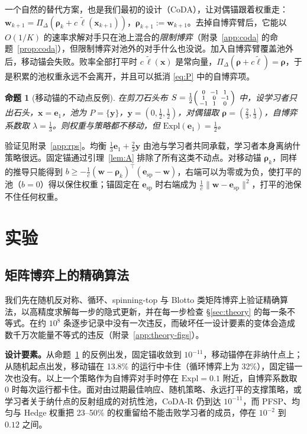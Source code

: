 \documentclass{article}
\theoremstyle{plain}
\newtheorem{proposition}[theorem]{命题}
\theoremstyle{remark}
\newcommand{\Expl}{\mathrm{Expl}}
\newcommand{\Proj}{\Pi}
\newcommand{\simplex}{\Delta}
\newcommand{\bx}{{\bm{x}}}
\newcommand{\by}{{\bm{y}}}
\newcommand{\bw}{{\bm{w}}}
\newcommand{\be}{{\bm{e}}}
\newcommand{\brho}{{\bm{\rho}}}
\newcommand{\bell}{{\bm{\ell}}}
\newcommand{\aug}{\tilde{\bell}}
\newcommand{\esp}{\be_{\mathrm{sp}}}
\newcommand{\coda}{CoDA}
\newcommand{\codar}{CoDA-R}
\begin{document}
一个自然的替代方案，也是我们最初的设计（\coda{}），让对偶锚跟着权重走：$\bw_{k+1}=\Proj_\simplex(\brho_k+c\,\aug(\bx_{k+1}))$，$\brho_{k+1}:=\bw_{k+1}$。去掉自博弈臂后，它能以 $O(1/K)$ 的速率求解对手只在池上混合的\emph{限制博弈}（附录~\ref{app:coda} 的命题~\ref{prop:coda}），但限制博弈对池外的对手什么也没说。加入自博弈臂覆盖池外后，移动锚会失败。败率全部打平时 $c\,\aug(\bx)$ 是常向量，$\Proj_\simplex(\brho+c\aug)=\brho$，于是积累的池权重永远不会离开，并且可以抵消 \eqref{eq:P} 中的自博弈项。

\begin{proposition}[移动锚的不动点反例]
\label{prop:rps}
在剪刀石头布 $S=\tfrac12\begin{psmallmatrix}0&-1&1\\1&0&-1\\-1&1&0\end{psmallmatrix}$ 中，设学习者只出石头，$\bx=\be_1$，池为 $P=\{\by\}$，$\by=(0,\tfrac12,\tfrac12)$，对偶锚取 $\brho=(\tfrac23,\tfrac13)$，自博弈系数取 $\lambda=\tfrac13$。则权重与策略都不移动，但 $\Expl(\be_1)=\tfrac12$。
\end{proposition}
验证见附录~\ref{app:rps}。均衡 $\tfrac13\be_1+\tfrac23\by$ 由池与学习者共同承载，学习者本身离纳什策略很远。固定锚通过引理~\ref{lem:A} 排除了所有这类不动点。对移动锚 $\brho_k$，同样的推导只能得到 $b\ge-\tfrac1c(\bw-\brho_k)^\top(\esp-\bw)$，右端可以为零或为负，使打平的池（$b=0$）得以保住权重；锚固定在 $\esp$ 时右端成为 $\tfrac1c\|\bw-\esp\|^2$，打平的池保不住任何权重。

\section{实验}
\label{sec:exp}


\subsection{矩阵博弈上的精确算法}
\label{sec:exp-theory}

我们先在随机反对称、循环、spinning-top\citep{czarnecki2020spinning} 与 Blotto 类矩阵博弈上验证精确算法，以高精度求解每一步的隐式更新，并在每一步检查 \S\ref{sec:theory} 的每一条不等式。在约 $10^8$ 条逐步记录中没有一次违反，而破坏任一设计要素的变体会造成数千万次能量不等式的违反（附录~\ref{app:theory-figs}）。

\textbf{设计要素。}从命题~\ref{prop:rps} 的反例出发，固定锚收敛到 $10^{-11}$，移动锚停在非纳什点上；从随机起点出发，移动锚在 13.8\% 的运行中卡住（循环博弈上为 32\%），固定锚一次也没有。以上一个策略作为自博弈对手时停在 $\Expl=0.1$ 附近，自博弈系数取 0 时每次运行都卡住。面对由过期最佳响应、随机策略、永远打平的支撑策略，或学习者关于纳什点的反射组成的对抗性池，\codar{} 仍到达 $10^{-11}$，而 PFSP、均匀与 Hedge 权重把 23--50\% 的权重留给不能击败学习者的成员，停在 $10^{-2}$ 到 $0.12$ 之间。
\end{document}
